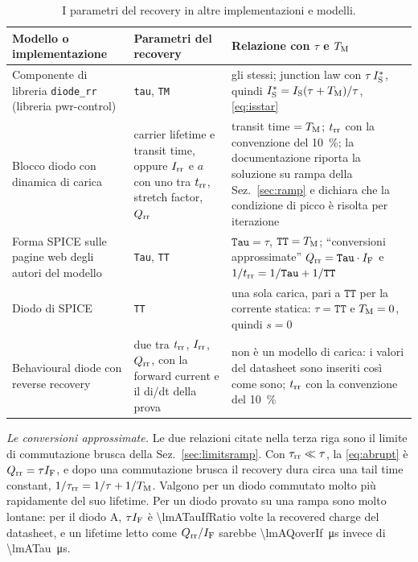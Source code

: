 \documentclass[10pt,a4paper]{scrartcl}
\let\newcommand\pdvaluedefine
\newcommand{\IF}{I_\mathrm{F}}
\newcommand{\Irr}{I_\mathrm{rr}}
\newcommand{\Qrr}{Q_\mathrm{rr}}
\newcommand{\trr}{t_\mathrm{rr}}
\newcommand{\taurr}{\tau_\mathrm{rr}}
\newcommand{\TM}{T_\mathrm{M}}
\newcommand{\IS}{I_\mathrm{S}}
\begin{document}
\begin{table}[htb]
\centering\small
\caption{I parametri del recovery in altre implementazioni e modelli.}
\label{tab:others}
\begin{tabular}{@{}>{\raggedright\arraybackslash}p{4.6cm}>{\raggedright\arraybackslash}p{4.2cm}>{\raggedright\arraybackslash}p{7.2cm}@{}}
\toprule
Modello o implementazione & Parametri del recovery & Relazione con $\tau$ e $\TM$ \\
\midrule
Componente di libreria \texttt{diode\_rr} (libreria pwr-control) & \texttt{tau}, \texttt{TM} & gli stessi; junction law con $\tau\,\IS^{*}$, quindi $\IS^{*} = \IS(\tau+\TM)/\tau$, \eqref{eq:isstar} \\
\addlinespace
Blocco diodo con dinamica di carica \cite{mathworks} & carrier lifetime e transit time, oppure $\Irr$ e $a$ con uno tra $\trr$, stretch factor, $\Qrr$ & transit time $= \TM$; $\trr$ con la convenzione del \SI{10}{\percent}; la documentazione riporta la soluzione su rampa della Sez.~\ref{sec:ramp} e dichiara che la condizione di picco è risolta per iterazione \\
\addlinespace
Forma SPICE sulle pagine web degli autori del modello \cite{pemodels} & \texttt{Tau}, \texttt{TT} & $\texttt{Tau} = \tau$, $\texttt{TT} = \TM$; ``conversioni approssimate'' $\Qrr = \texttt{Tau}\cdot\IF$ e $1/\trr = 1/\texttt{Tau} + 1/\texttt{TT}$ \\
\addlinespace
Diodo di SPICE & \texttt{TT} & una sola carica, pari a $\texttt{TT}$ per la corrente statica: $\tau = \texttt{TT}$ e $\TM = 0$, quindi $s = 0$ \\
\addlinespace
Behavioural diode con reverse recovery \cite{plecs} & due tra $\trr$, $\Irr$, $\Qrr$, con la forward current e il di/dt della prova & non è un modello di carica: i valori del datasheet sono inseriti così come sono; $\trr$ con la convenzione del \SI{10}{\percent} \\
\bottomrule
\end{tabular}
\end{table}

\emph{Le conversioni approssimate.} Le due relazioni citate nella terza riga sono il limite di commutazione brusca della Sez.~\ref{sec:limitsramp}. Con $\taurr \ll \tau$, la \eqref{eq:abrupt} è $\Qrr = \tau\IF$, e dopo una commutazione brusca il recovery dura circa una tail time constant, $1/\taurr = 1/\tau + 1/\TM$. Valgono per un diodo commutato molto più rapidamente del suo lifetime. Per un diodo provato su una rampa sono molto lontane: per il diodo A, $\tau\IF$ è \num{\lmATauIfRatio} volte la recovered charge del datasheet, e un lifetime letto come $\Qrr/\IF$ sarebbe \SI{\lmAQoverIf}{\micro\second} invece di \SI{\lmATau}{\micro\second}.
\end{document}
